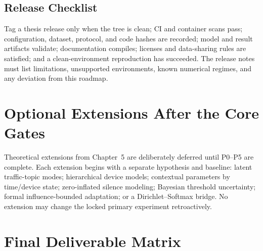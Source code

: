 \documentclass[11pt,a4paper]{article}
\begin{document}
\subsection{Release Checklist}

Tag a thesis release only when the tree is clean; CI and container scans pass; configuration, dataset, protocol, and code hashes are recorded; model and result artifacts validate; documentation compiles; licenses and data-sharing rules are satisfied; and a clean-environment reproduction has succeeded. The release notes must list limitations, unsupported environments, known numerical regimes, and any deviation from this roadmap.

\section{Optional Extensions After the Core Gates}

Theoretical extensions from Chapter~5 are deliberately deferred until P0--P5 are complete. Each extension begins with a separate hypothesis and baseline: latent traffic-topic modes; hierarchical device models; contextual parameters by time/device state; zero-inflated silence modeling; Bayesian threshold uncertainty; formal influence-bounded adaptation; or a Dirichlet--Softmax bridge. No extension may change the locked primary experiment retroactively.

\section{Final Deliverable Matrix}
\end{document}
